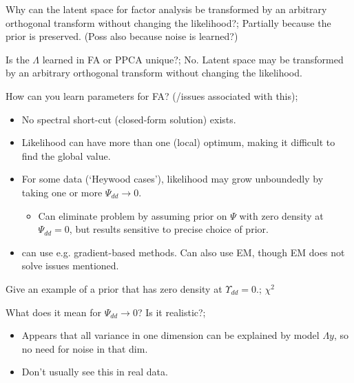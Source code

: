 \documentclass{article}
\begin{document}
Why can the latent space for factor analysis be transformed by an arbitrary orthogonal transform without changing the likelihood?; Partially because the prior is preserved. (Poss also because noise is learned?)

Is the $\Lambda$ learned in FA or PPCA unique?; No. Latent space may be transformed by an arbitrary orthogonal transform without changing the likelihood.

How can you learn parameters for FA? (/issues associated with this); \begin{itemize} \item No spectral short-cut (closed-form solution) exists.  \item Likelihood can have more than one (local) optimum, making it difficult to find the global value.  \item For some data (`Heywood cases'), likelihood may grow unboundedly by taking one or more $\Psi_{dd}\rightarrow 0$.  \begin{itemize} \item Can eliminate problem by assuming prior on $\Psi$ with zero density at $\Psi_{dd}=0$, but results sensitive to precise choice of prior.  \end{itemize} \item can use e.g. gradient-based methods. Can also use EM, though EM does not solve issues mentioned.  \end{itemize}

Give an example of a prior that has zero density at $\Upsilon_{dd}=0$.; $\chi^2$ 

What does it mean for $\Psi_{dd}\rightarrow 0$? Is it realistic?; \begin{itemize} \item Appears that all variance in one dimension can be explained by model $\Lambda y$, so no need for noise in that dim.  \item Don't usually see this in real data.  \end{itemize}
\end{document}
